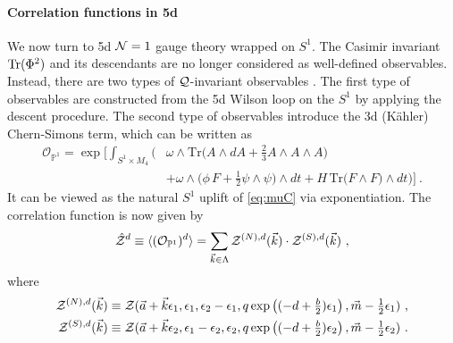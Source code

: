 \documentclass[letterpaper, 11pt]{article}
\def\IC{\mathbb{C}}
\def\IP{\mathbb{P}}
\def\CN{{\cal N}}
\def\CO{{\cal O}}
\def\CQ{{\cal Q}}
\def\CZ{{\cal Z}}
\def\e{\epsilon}
\def\Tr{{\rm Tr}}
\begin{document}
\paragraph{Correlation functions in 5d}
We now turn to 5d $\CN=1$ gauge theory wrapped on $S^1$. The Casimir invariant $\Tr (\Phi^2)$ and its descendants are no longer considered as well-defined observables. Instead, there are two types of $\CQ$-invariant observables \cite{Baulieu:1997nj}. The first type of observables are constructed from the 5d Wilson loop on the $S^1$ by applying the descent procedure. The second type of observables introduce the 3d (K\"ahler) Chern-Simons term, which can be written as \cite{Losev:1995cr,Baulieu:1997nj}
\begin{align} 
  \mathcal{O}_{\IP^1} = \exp\bigg[
    \int_{S^1 \times M_4} \bigg( & \omega \wedge \text{Tr}\Big(A \wedge dA + \frac{2}{3}A\wedge A \wedge A \Big) \\ \nonumber
     & + \omega \wedge \Big( \phi \, F + \frac{1}{2}\psi \wedge \psi \Big)\wedge dt + H\, \text{Tr}\Big( F \wedge F \Big) \wedge dt \bigg)
     \bigg] \ .
\end{align}
It can be viewed as the natural $S^1$ uplift of \eqref{eq:muC} via exponentiation. The correlation function is now given by
\begin{align}
  \label{eq:cor5d}
  \hat{\CZ}^{d} \equiv \langle (\mathcal{O}_{\IP^1})^{d}\rangle = \sum_{\vec{k} \in \Lambda}  \CZ^{(N),d}(\vec{k}) \cdot \CZ^{(S),d}(\vec{k}) \ , 
\end{align} 
%
where
\begin{align}
  \label{eq:param-np-sp5d}
\begin{split}
  \CZ^{(N),d}(\vec{k}) &\equiv \CZ(\vec{a}+\vec{k} \e_1, \e_1, \e_2-\e_1, q \exp \left((-d + \tfrac{b}{2})\e_1 \right), \vec{m} -\tfrac{1}{2}\e_1) \ , \\
  \CZ^{(S),d}(\vec{k}) &\equiv \CZ(\vec{a}+\vec{k} \e_2, \e_1 - \e_2, \e_2, q \exp \left( (-d + \tfrac{b}{2})\e_2\right), \vec{m} -\tfrac{1}{2}\e_2)\ . 
\end{split}
\end{align}
\end{document}

